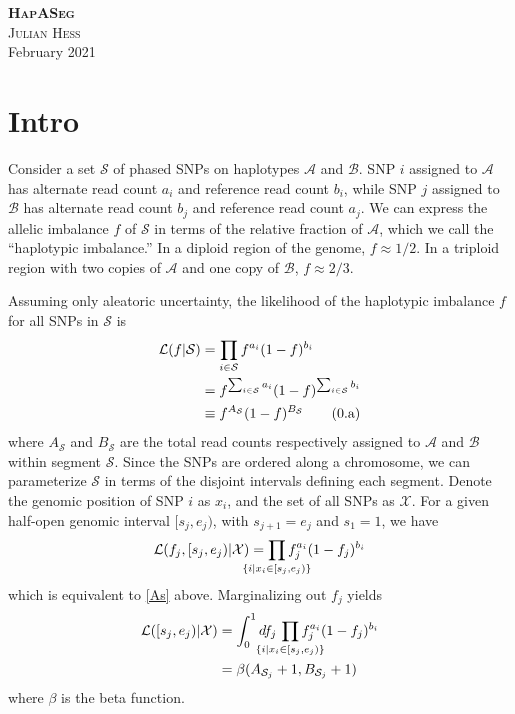 \documentclass[10pt,letter]{article}
\numberwithin{equation}{section}
\newcommand{\rt}{\right}
\newcommand{\lt}{\left}
\newcommand{\btag}[1]{\addtocounter{equation}{1}\label{#1}\tag{\arabic{section}.\alph{equation}}}
\newcommand{\textop}[1]{\operatorname{#1}}
\begin{document}
\noindent\textbf{\textsc{HapASeg}}\\
\noindent\textsc{Julian Hess}\\
 February 2021\\

\section{Intro}

Consider a set $\mathcal{S}$ of phased SNPs on haplotypes $\mathcal{A}$ and $\mathcal{B}$. SNP $i$ assigned to $\mathcal{A}$ has alternate read count $a_i$ and reference read count $b_i$, while SNP $j$ assigned to $\mathcal{B}$ has alternate read count $b_j$ and reference read count $a_j$. We can express the allelic imbalance $f$ of $\mathcal{S}$ in terms of the relative fraction of $\mathcal{A}$, which we call the ``haplotypic imbalance.'' In a diploid region of the genome, $f\approx 1/2$. In a triploid region with two copies of $\mathcal{A}$ and one copy of $\mathcal{B}$, $f\approx 2/3$.

Assuming only aleatoric uncertainty, the likelihood of the haplotypic imbalance $f$ for all SNPs in $\mathcal{S}$ is
\begin{align*}
\mathcal{L}(f|\mathcal{S}) &= \prod_{i\in\mathcal{S}} f^{a_i} (1 - f)^{b_i}\\
&= f^{\sum_{i\in\mathcal{S}} a_i}(1-f)^{\sum_{i\in\mathcal{S}} b_i}\\
&\equiv f^{A_\mathcal{S}}(1-f)^{B_\mathcal{S}}\btag{As}
\end{align*}
where $A_\mathcal{S}$ and $B_\mathcal{S}$ are the total read counts respectively assigned to $\mathcal{A}$ and $\mathcal{B}$ within segment $\mathcal{S}$. Since the SNPs are ordered along a chromosome, we can parameterize $\mathcal{S}$ in terms of the disjoint intervals defining each segment. Denote the genomic position of SNP $i$ as $x_i$, and the set of all SNPs as $\mathcal{X}$. For a given half-open genomic interval $[s_j,e_j)$, with $s_{j+1}=e_j$ and $s_1=1$, we have
\begin{align*}
\mathcal{L}(f_j,[s_j,e_j)|\mathcal{X})=\prod_{\mathclap{\{i|x_i\in [s_j, e_j)\}}} f_j^{a_i}(1 - f_j)^{b_i}
\end{align*}
which is equivalent to \eqref{As} above. Marginalizing out $f_j$ yields
\begin{align*}
\mathcal{L}([s_j,e_j)|\mathcal{X})&=\int_0^1 df_j\,\prod_{\mathclap{\{i|x_i\in [s_j, e_j)\}}} f_j^{a_i}(1 - f_j)^{b_i}\\
&= \beta(A_{\mathcal{S}_j}+1, B_{\mathcal{S}_j}+1)
\end{align*}
where $\beta$ is the beta function.
\end{document}
